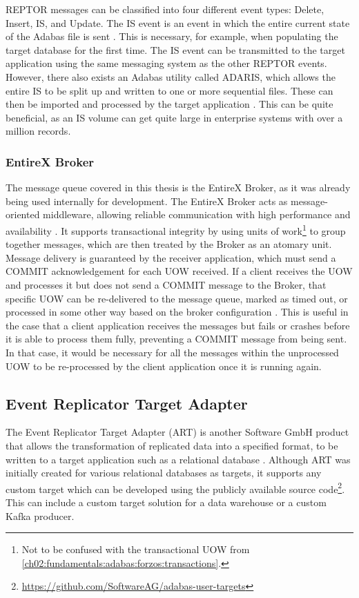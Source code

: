 \ac{REPTOR} messages can be classified into four different event types: Delete, Insert, \ac{IS}, and Update. The \ac{IS} event is an event in which the entire current state of the Adabas file is sent \cite{reptorprogrammersref}. This is necessary, for example, when populating the target database for the first time. The \ac{IS} event can be transmitted to the target application using the same messaging system as the other \ac{REPTOR} events. However, there also exists an Adabas utility called ADARIS, which allows the entire \ac{IS} to be split up and written to one or more sequential files. These can then be imported and processed by the target application \cite{reptorconcepts}. This can be quite beneficial, as an \ac{IS} volume can get quite large in enterprise systems with over a million records.

\subsubsection{EntireX Broker}
\label{ch02:fundamentals:adabas:entirex}
The message queue covered in this thesis is the EntireX Broker, as it was already being used internally for development. The EntireX Broker acts as message-oriented middleware, allowing reliable communication with high performance and availability \cite{entirexbrokerintro}. It supports transactional integrity by using units of work\footnote{Not to be confused with the transactional \ac{UOW} from \ref{ch02:fundamentals:adabas:forzos:transactions}.} to group together messages, which are then treated by the Broker as an atomary unit. Message delivery is guaranteed by the receiver application, which must send a COMMIT acknowledgement for each \ac{UOW} received. If a client receives the \ac{UOW} and processes it but does not send a COMMIT message to the Broker, that specific \ac{UOW} can be re-delivered to the message queue, marked as timed out, or processed in some other way based on the broker configuration \cite{entirexbrokeradmin}. This is useful in the case that a client application receives the messages but fails or crashes before it is able to process them fully, preventing a COMMIT message from being sent. In that case, it would be necessary for all the messages within the unprocessed \ac{UOW} to be re-processed by the client application once it is running again.

\subsection{Event Replicator Target Adapter}
\label{ch02:fundamentals:adabas:art}
The Event Replicator Target Adapter (\ac{ART}) is another Software GmbH product that allows the transformation of replicated data into a specified format, to be written to a target application such as a relational database \cite{artconcepts}. Although \ac{ART} was initially created for various relational databases as targets, it supports any custom target which can be developed using the publicly available source code\footnote{\url{https://github.com/SoftwareAG/adabas-user-targets}}. This can include a custom target solution for a data warehouse or a custom Kafka producer.

